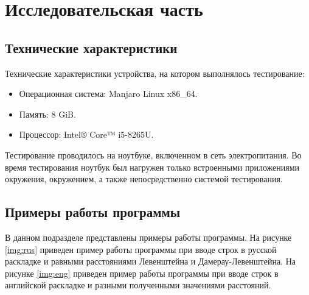 \chapter{Исследовательская часть}

\section{Технические характеристики}

Технические характеристики устройства, на котором выполнялось тестирование:

\begin{itemize}
	\item Операционная система: Manjaro \cite{manjaro} Linux x86\_64.
	\item Память: 8 GiB.
	\item Процессор: Intel® Core™ i5-8265U\cite{intel}.
\end{itemize}

Тестирование проводилось на ноутбуке, включенном в сеть электропитания. Во
время тестирования ноутбук был нагружен только встроенными приложениями
окружения, окружением, а также непосредственно системой тестирования.

\section{Примеры работы программы}

В данном подразделе представлены примеры работы программы. На рисунке
\ref{img:rus} приведен пример работы программы при вводе строк в русской
раскладке и равными расстояниями Левенштейна и Дамерау-Левенштейна. На рисунке
\ref{img:eng} приведен пример работы программы при вводе строк в английской
раскладке и разными полученными значениями расстояний.



